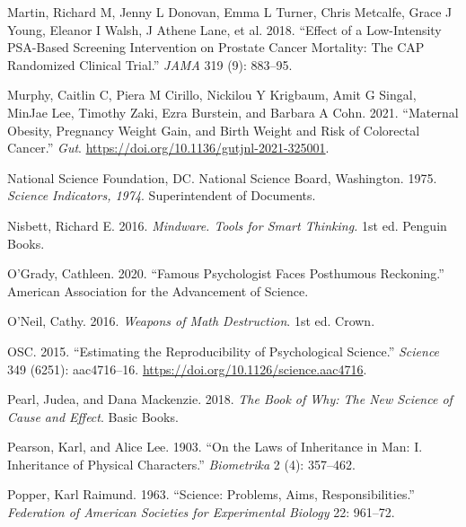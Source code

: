 \documentclass[
  10pt,
  b5paper]{book}
\newlength{\cslhangindent}
\newlength{\cslentryspacingunit} %
\newenvironment{CSLReferences}[2] %
 {%
  \setlength{\parindent}{0pt}
  \ifodd #1
  \let\oldpar\par
  \def\par{\hangindent=\cslhangindent\oldpar}
  \fi
  \setlength{\parskip}{#2\cslentryspacingunit}
 }%
 {}
\begin{document}
\begin{CSLReferences}{1}{0}
\leavevmode{}%
Martin, Richard M, Jenny L Donovan, Emma L Turner, Chris Metcalfe, Grace J Young, Eleanor I Walsh, J Athene Lane, et al. 2018. {``Effect of a Low-Intensity PSA-Based Screening Intervention on Prostate Cancer Mortality: The CAP Randomized Clinical Trial.''} \emph{JAMA} 319 (9): 883--95.

\leavevmode{}%
Murphy, Caitlin C, Piera M Cirillo, Nickilou Y Krigbaum, Amit G Singal, MinJae Lee, Timothy Zaki, Ezra Burstein, and Barbara A Cohn. 2021. {``Maternal Obesity, Pregnancy Weight Gain, and Birth Weight and Risk of Colorectal Cancer.''} \emph{Gut}. \url{https://doi.org/10.1136/gutjnl-2021-325001}.

\leavevmode{}%
National Science Foundation, DC. National Science Board, Washington. 1975. \emph{Science Indicators, 1974}. Superintendent of Documents.

\leavevmode{}%
Nisbett, Richard E. 2016. \emph{Mindware. Tools for Smart Thinking.} 1st ed. Penguin Books.

\leavevmode{}%
O'Grady, Cathleen. 2020. {``Famous Psychologist Faces Posthumous Reckoning.''} American Association for the Advancement of Science.

\leavevmode{}%
O'Neil, Cathy. 2016. \emph{Weapons of Math Destruction}. 1st ed. Crown.

\leavevmode{}%
OSC. 2015. {``Estimating the Reproducibility of Psychological Science.''} \emph{Science} 349 (6251): aac4716--16. \url{https://doi.org/10.1126/science.aac4716}.

\leavevmode{}%
Pearl, Judea, and Dana Mackenzie. 2018. \emph{The Book of Why: The New Science of Cause and Effect}. Basic Books.

\leavevmode{}%
Pearson, Karl, and Alice Lee. 1903. {``On the Laws of Inheritance in Man: I. Inheritance of Physical Characters.''} \emph{Biometrika} 2 (4): 357--462.

\leavevmode{}%
Popper, Karl Raimund. 1963. {``Science: Problems, Aims, Responsibilities.''} \emph{Federation of American Societies for Experimental Biology} 22: 961--72.


\end{CSLReferences}
\end{document}
